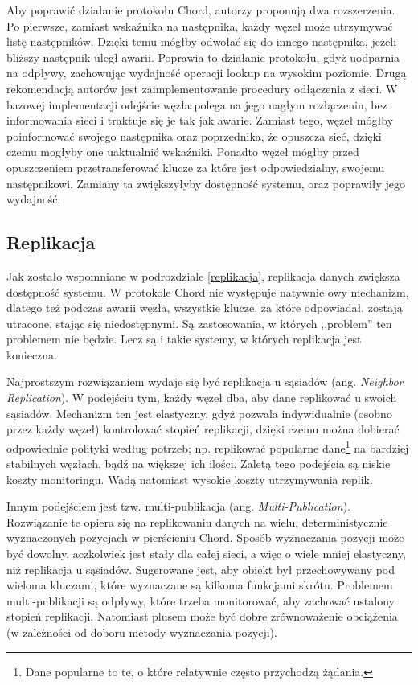 \documentclass[12pt, twoside, openany]{report}
\begin{document}
Aby poprawić działanie protokołu Chord, autorzy proponują dwa rozszerzenia. Po pierwsze, zamiast wskaźnika na następnika, każdy węzeł może utrzymywać listę następników. Dzięki temu mógłby odwołać się do innego następnika, jeżeli bliższy następnik uległ awarii. Poprawia to działanie protokołu, gdyż uodparnia na odpływy, zachowując wydajność operacji lookup na wysokim poziomie. Drugą rekomendacją autorów jest zaimplementowanie procedury odłączenia z sieci. W bazowej implementacji odejście węzła polega na jego nagłym rozłączeniu, bez informowania sieci i traktuje się je tak jak awarie. Zamiast tego, węzeł mógłby poinformować swojego następnika oraz poprzednika, że opuszcza sieć, dzięki czemu mogłyby one uaktualnić wskaźniki. Ponadto węzeł mógłby przed opuszczeniem przetransferować klucze za które jest odpowiedzialny, swojemu następnikowi. Zamiany ta zwiększyłyby dostępność systemu, oraz poprawiły jego wydajność.

\subsection{Replikacja}

Jak zostało wspomniane w podrozdziale \ref{replikacja}, replikacja danych zwiększa dostępność systemu. W protokole Chord nie występuje natywnie owy mechanizm, dlatego też podczas awarii węzła, wszystkie klucze, za które odpowiadał, zostają utracone, stając się niedostępnymi. Są zastosowania, w których ,,problem'' ten problemem nie będzie. Lecz są i takie systemy, w których replikacja jest konieczna.

Najprostszym rozwiązaniem wydaje się być replikacja u sąsiadów (ang. \textit{Neighbor Replication}). W podejściu tym, każdy węzeł dba, aby dane replikować u swoich sąsiadów. Mechanizm ten jest elastyczny, gdyż pozwala indywidualnie (osobno przez każdy węzeł) kontrolować stopień replikacji, dzięki czemu można dobierać odpowiednie polityki według potrzeb; np. replikować popularne dane\footnote{Dane popularne to te, o które relatywnie często przychodzą żądania.} na bardziej stabilnych węzłach, bądź na większej ich ilości. Zaletą tego podejścia są niskie koszty monitoringu. Wadą natomiast wysokie koszty utrzymywania replik.

Innym podejściem jest tzw. multi-publikacja (ang. \textit{Multi-Publication}). Rozwiązanie te opiera się na replikowaniu danych na wielu, deterministycznie wyznaczonych pozycjach w pierścieniu Chord. Sposób wyznaczania pozycji może być dowolny, aczkolwiek jest stały dla całej sieci, a więc o wiele mniej elastyczny, niż replikacja u sąsiadów. Sugerowane jest, aby obiekt był przechowywany pod wieloma kluczami, które wyznaczane są kilkoma funkcjami skrótu. Problemem multi-publikacji są odpływy, które trzeba monitorować, aby zachować ustalony stopień replikacji. Natomiast plusem może być dobre zrównoważenie obciążenia (w zależności od doboru metody wyznaczania pozycji).
\end{document}
